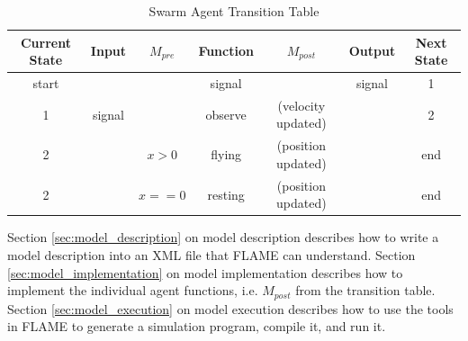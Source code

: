 \begin{table}[ht]
\centering
\begin{tabular}{|c|c|c||c||c|c|c|}
\hline
Current State&Input&$M_{pre}$&Function&$M_{post}$&Output&Next State\\
\hline
\hline
start&&&signal&&signal&1\\
\hline
1&signal&&observe&(velocity updated)&&2\\
\hline
2&&$x > 0$&flying&(position updated)&&end\\
\hline
2&&$x == 0$&resting&(position updated)&&end\\
\hline
\end{tabular}
\caption{Swarm Agent Transition Table}
\label{tab:swarmtransition}
\end{table}

Section \ref{sec:model_description} on model description describes how to write
a model description into an XML file that FLAME can understand. Section
\ref{sec:model_implementation} on model implementation describes how to
implement the individual agent functions, i.e. $M_{post}$ from the transition table.
Section \ref{sec:model_execution} on model execution describes how to use the
tools in FLAME to generate a simulation program, compile it, and run it.

